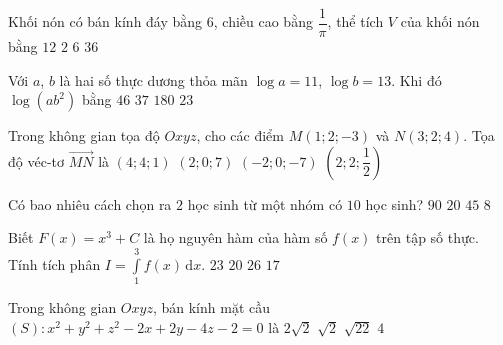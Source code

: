 \begin{ex}%
	Khối nón có bán kính đáy bằng $6$, chiều cao bằng $\dfrac{1}{\pi}$, thể tích $V$ của khối nón bằng
	\choice
	{\True $12$}
	{$2$}
	{$6$}
	{$36$}
\end{ex}
\begin{ex}%
	Với $a$, $b$ là hai số thực dương thỏa mãn $\log a=11$, $\log b=13$. Khi đó $\log\left(ab^2\right)$ bằng
	\choice
	{$46$}
	{\True $37$}
	{$180$}
	{$23$}
\end{ex}
\begin{ex}%
	Trong không gian tọa độ $Oxyz$, cho các điểm $M(1;2;-3)$ và $N(3;2;4)$. Tọa độ véc-tơ $\overrightarrow{MN}$ là
	\choice
	{$(4;4;1)$}
	{\True $(2;0;7)$}
	{$(-2;0;-7)$}
	{$\left(2;2;\dfrac{1}{2}\right)$}
\end{ex}
\begin{ex}%
	Có bao nhiêu cách chọn ra $2$ học sinh từ một nhóm có $10$ học sinh?
	\choice
	{$90$}
	{$20$}
	{\True $45$}
	{$8$}
\end{ex}
\begin{ex}%
	Biết $F(x)=x^3+C$ là họ nguyên hàm của hàm số $f(x)$ trên tập số thực. Tính tích phân $I=\displaystyle\int\limits_1^3f(x)\mathrm{\,d}x$.
	\choice
	{$23$}
	{$20$}
	{\True $26$}
	{$17$}
\end{ex}
\begin{ex}%
	Trong không gian $Oxyz$, bán kính mặt cầu $(S)\colon x^2+y^2+z^2-2x+2y-4z-2=0$ là
	\choice
	{\True $2\sqrt{2}$}
	{$\sqrt{2}$}
	{$\sqrt{22}$}
	{$4$}
\end{ex}
